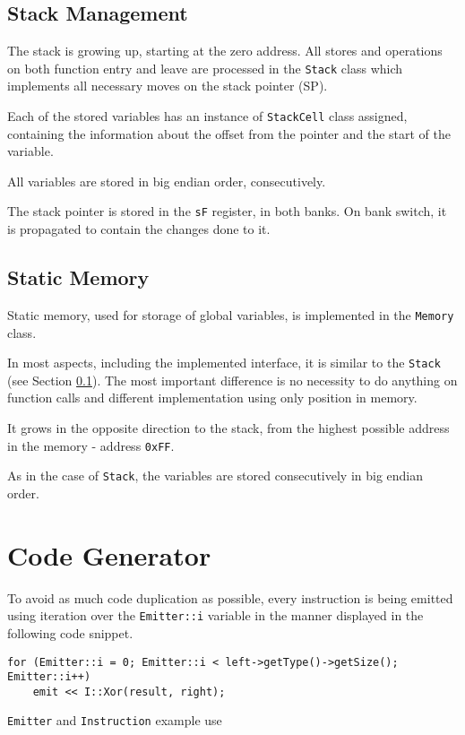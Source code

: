         \subsection{Stack Management}\label{stack}

        The stack is growing up, starting at the zero address. All stores and operations on both function entry and leave are processed in the \texttt{Stack} class which implements all necessary moves on the stack pointer (SP).

        Each of the stored variables has an instance of \texttt{StackCell} class assigned, containing the information about the offset from the pointer and the start of the variable.

        All variables are stored in big endian order, consecutively.

        The stack pointer is stored in the \texttt{sF} register, in both banks. On bank switch, it is propagated to contain the changes done to it.

        \subsection{Static Memory}

        Static memory, used for storage of global variables, is implemented in the \texttt{Memory} class.

        In most aspects, including the implemented interface, it is similar to the \texttt{Stack} (see Section \ref{stack}). The most important difference is no necessity to do anything on function calls and different implementation using only position in memory.

        It grows in the opposite direction to the stack, from the highest possible address in the memory - address \texttt{0xFF}.

        As in the case of \texttt{Stack}, the variables are stored consecutively in big endian order.

    \section{Code Generator}

    To avoid as much code duplication as possible, every instruction is being emitted using iteration over the \texttt{Emitter::i} variable in the manner displayed in the following code snippet.

    \begin{listing}
    \centering
    \begin{verbatim}for (Emitter::i = 0; Emitter::i < left->getType()->getSize(); Emitter::i++)
    emit << I::Xor(result, right);\end{verbatim}
    \caption{\texttt{Emitter} and \texttt{Instruction} example use}
    \end{listing}

